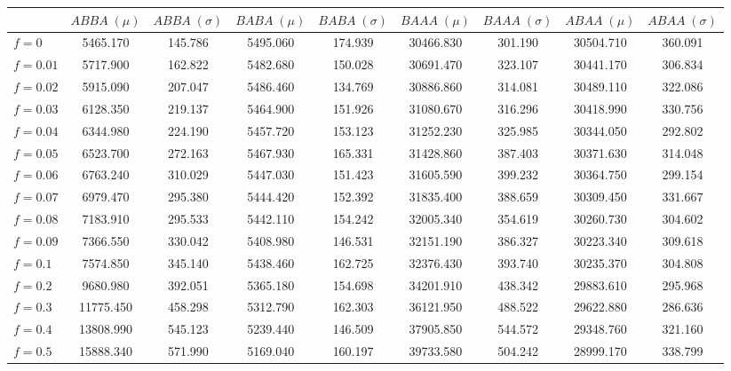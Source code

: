 \begin{tabular}{lcccccccc}
\toprule
 & $ABBA \;(\mu)$ & $ABBA \;(\sigma)$ & $BABA \;(\mu)$ & $BABA \;(\sigma)$ & $BAAA \;(\mu)$ & $BAAA \;(\sigma)$ & $ABAA \;(\mu)$ & $ABAA \;(\sigma)$ \\
\midrule
$f = 0$ & 5465.170 & 145.786 & 5495.060 & 174.939 & 30466.830 & 301.190 & 30504.710 & 360.091 \\
$f = 0.01$ & 5717.900 & 162.822 & 5482.680 & 150.028 & 30691.470 & 323.107 & 30441.170 & 306.834 \\
$f = 0.02$ & 5915.090 & 207.047 & 5486.460 & 134.769 & 30886.860 & 314.081 & 30489.110 & 322.086 \\
$f = 0.03$ & 6128.350 & 219.137 & 5464.900 & 151.926 & 31080.670 & 316.296 & 30418.990 & 330.756 \\
$f = 0.04$ & 6344.980 & 224.190 & 5457.720 & 153.123 & 31252.230 & 325.985 & 30344.050 & 292.802 \\
$f = 0.05$ & 6523.700 & 272.163 & 5467.930 & 165.331 & 31428.860 & 387.403 & 30371.630 & 314.048 \\
$f = 0.06$ & 6763.240 & 310.029 & 5447.030 & 151.423 & 31605.590 & 399.232 & 30364.750 & 299.154 \\
$f = 0.07$ & 6979.470 & 295.380 & 5444.420 & 152.392 & 31835.400 & 388.659 & 30309.450 & 331.667 \\
$f = 0.08$ & 7183.910 & 295.533 & 5442.110 & 154.242 & 32005.340 & 354.619 & 30260.730 & 304.602 \\
$f = 0.09$ & 7366.550 & 330.042 & 5408.980 & 146.531 & 32151.190 & 386.327 & 30223.340 & 309.618 \\
$f = 0.1$ & 7574.850 & 345.140 & 5438.460 & 162.725 & 32376.430 & 393.740 & 30235.370 & 304.808 \\
$f = 0.2$ & 9680.980 & 392.051 & 5365.180 & 154.698 & 34201.910 & 438.342 & 29883.610 & 295.968 \\
$f = 0.3$ & 11775.450 & 458.298 & 5312.790 & 162.303 & 36121.950 & 488.522 & 29622.880 & 286.636 \\
$f = 0.4$ & 13808.990 & 545.123 & 5239.440 & 146.509 & 37905.850 & 544.572 & 29348.760 & 321.160 \\
$f = 0.5$ & 15888.340 & 571.990 & 5169.040 & 160.197 & 39733.580 & 504.242 & 28999.170 & 338.799 \\
\bottomrule
\end{tabular}
